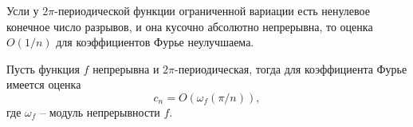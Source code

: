 \begin{to_lem}
    Усли у $2\pi$-периодической функции ограниченной вариации есть ненулевое конечное число разрывов, и она кусочно абсолютно непрерывна, то оценка $O(1/n)$ для коэффициентов Фурье неулучшаема.
\end{to_lem}

\begin{to_thr}[]
    Пусть функция $f$ непрерывна и $2\pi$-периодическая, тогда для коэффициента Фурье имеется оценка
    \begin{equation*}
        c_n = O(\omega_f (\pi/n)),
    \end{equation*}
    где $\omega_f$ -- модуль непрерывности $f$.
\end{to_thr}